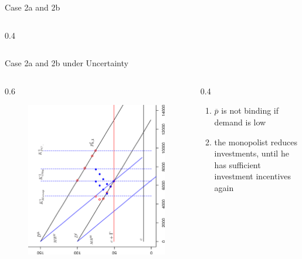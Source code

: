 \begin{frame} {Case 2a and 2b}
\begin{columns}
\begin{column} {0.4\textwidth}
\end{column}
\end{columns}
\end{frame}


\begin{frame} {Case 2a and 2b under Uncertainty}					
\begin{columns}
\begin{column} {0.6\textwidth}
\begin{figure}[h]
\centering
\includegraphics[width=1.0\textwidth, angle=270]{55}
    \label{fig:1}            
\end{figure}
\end{column}

\begin{column} {0.4\textwidth}

\begin{enumerate}
	\item $\overline{p}$ is not binding if demand is low
	\item the monopolist reduces investments, until he has sufficient investment incentives again
\end{enumerate}

\end{column}
\end{columns}
\end{frame}

